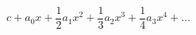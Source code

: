 \documentclass[12pt]{article}
\begin{document}
\sicpsize
\[
c + a_0x + \frac{1}{2}a_1x^2 + \frac{1}{3}a_2x^3 + \frac{1}{4}a_3x^4 + \dots
\]
\end{document}
